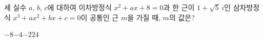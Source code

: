 세 실수 $a$, $b$, $c$에 대하여 이차방정식 $x^2+ax+8=0$과 한 근이 $1+\sqrt{5}\,i$인 삼차방정식 $x^3+ax^2+bx+c=0$이 공통인 근 $m$을 가질 때, $m$의 값은?
\begin{choices32}{$-8$}{$-4$}{$-2$}{$2$}{$4$}\end{choices32}
